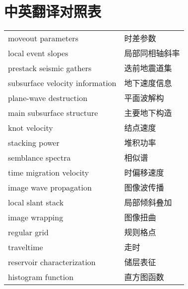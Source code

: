 \section{中英翻译对照表}
\begin{center}
%

\tabletail{\midrule}
\tablelasttail{\bottomrule}
\begin{xtabular}{ll}
    moveout parameters & 时差参数\\
    local event slopes & 局部同相轴斜率\\
    prestack seismic gathers & 迭前地震道集\\
    subsurface velocity information & 地下速度信息\\
    plane-wave destruction & 平面波解构\\
    main subsurface structure & 主要地下构造\\
    knot velocity & 结点速度\\
    stacking power & 堆积功率\\
    semblance spectra & 相似谱\\
    time migration velocity & 时偏移速度\\
    image wave propagation & 图像波传播\\
    local slant stack & 局部倾斜叠加\\
    image wrapping & 图像扭曲\\
    regular grid & 规则格点\\
    traveltime & 走时\\
    reservoir characterization & 储层表征\\
    histogram function & 直方图函数\\

\end{xtabular}%
\end{center}
